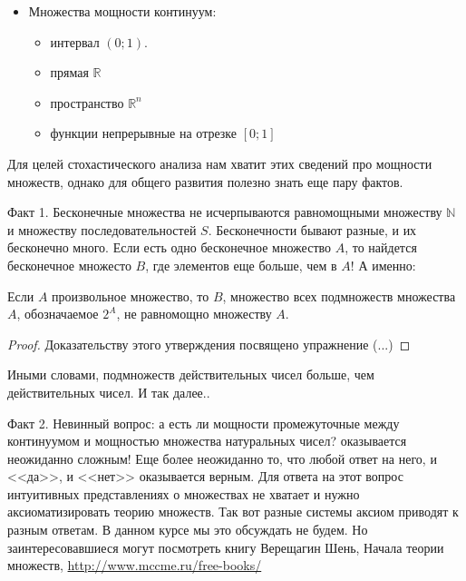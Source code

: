 {\begin{itemize}
\begin{itemize}
\item $\mathbb{Z}^{n}$
Доказательство --- по индукции. Мы уже доказали, что $ \mathbb{Z}^{1} $ --- счетное множество. Теперь предположим, что $ \mathbb{Z}^{n-1} $ --- счетное. Получаем цепочку: $ \mathbb{Z}^{n} \simeq \mathbb{Z}^{n-1}\times\mathbb{Z}^{1}\simeq \mathbb{N}\times \mathbb{N}\simeq \mathbb{N} $.
\item $\mathbb{Q}$. Пусть $ f(q) $ --- это сумма модулей числителя и знаменателя дроби (после сокращения), например, $ f(-2/3)=5 $. Сначала нумеруем дроби с $ f(q)<2 $, потом --- дроби с $ f(q)<3 $, потом --- дроби с $ f(q)<4 $ и т.д. В результате каждая дробь получает свой номер. 
\end{itemize}



\item Множества мощности континуум:
\begin{itemize}
\item интервал $(0;1)$. 
\item прямая $\mathbb{R}$
\item пространство $\mathbb{R}^{n}$
\item функции непрерывные на отрезке  $[0;1]$
\end{itemize}


\end{itemize}



Для целей стохастического анализа нам хватит этих сведений про мощности множеств, однако для общего развития полезно знать еще пару фактов.

Факт 1. Бесконечные множества не исчерпываются равномощными множеству $\mathbb{N}$ и множеству последовательностей $S$. Бесконечности бывают разные, и их бесконечно много. Если есть одно бесконечное множество $A$, то найдется бесконечное множесто $B$, где элементов еще больше, чем в $A$! А именно:

\begin{myth} Если $A$ произвольное множество, то $B$, множество всех подмножеств множества $A$, обозначаемое $2^{A}$, не равномощно множеству $A$.
\end{myth}
\begin{proof} Доказательству этого утверждения посвящено упражнение (...)
\end{proof}
Иными словами, подмножеств действительных чисел больше, чем действительных чисел. И так далее..

Факт 2. Невинный вопрос: а есть ли мощности промежуточные между континуумом и мощностью множества натуральных чисел? оказывается неожиданно сложным! Еще более неожиданно то, что любой ответ на него, и <<да>>, и <<нет>> оказывается верным. Для ответа на этот вопрос интуитивных представлениях о множествах не хватает и нужно аксиоматизировать теорию множеств. Так вот разные системы аксиом приводят к разным ответам. В данном курсе мы это обсуждать не будем. Но заинтересовавшиеся могут посмотреть книгу Верещагин Шень, Начала теории множеств,
\url{http://www.mccme.ru/free-books/}


}
